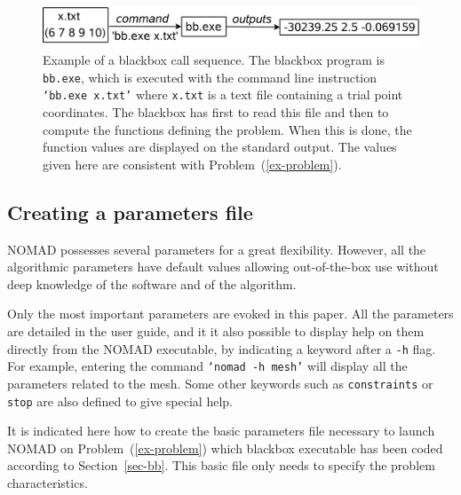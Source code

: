 \documentclass[12pt,english]{article}
\newcommand{\nomad}{NOMAD\xspace}
\newcommand{\bb}{blackbox\xspace}
\begin{document}
\begin{figure}
\begin{center}
  \includegraphics[width=14cm]{bb}
\end{center}
\caption{Example of a \bb call sequence. The \bb program is \texttt{bb.exe},
              which is executed with the command line instruction
              \texttt{`bb.exe x.txt'} where \texttt{x.txt} is a text file containing
              a trial point coordinates. The \bb has first to read this file and then
              to compute the functions defining the problem. When this is done,
              the function values are displayed on the standard output.
              The values given here are consistent with
              Problem~(\ref{ex-problem}).
              }
\label{fig-bb}
\end{figure}

\subsection*{Creating a parameters file}

\nomad possesses several parameters for a great flexibility.
   However, all the algorithmic parameters have default values allowing
   out-of-the-box use without deep knowledge of the software and of the
   algorithm.

 Only the most important parameters are evoked in this paper.
 All the parameters are detailed in the user guide, and
  it it also possible
  to display help on them directly from the \nomad executable, by indicating
  a keyword after a \texttt{-h} flag.
  For example, entering the command \texttt{`nomad -h mesh'}
    will display all the parameters related to the mesh.
  Some other keywords such as \texttt{constraints} or \texttt{stop}
  are also defined to give special help.

It is indicated here how to create the basic parameters file necessary to launch \nomad
 on Problem~(\ref{ex-problem})
 which \bb executable has been coded according to Section~\ref{sec-bb}.
This basic file only needs to specify the problem characteristics.
\end{document}
